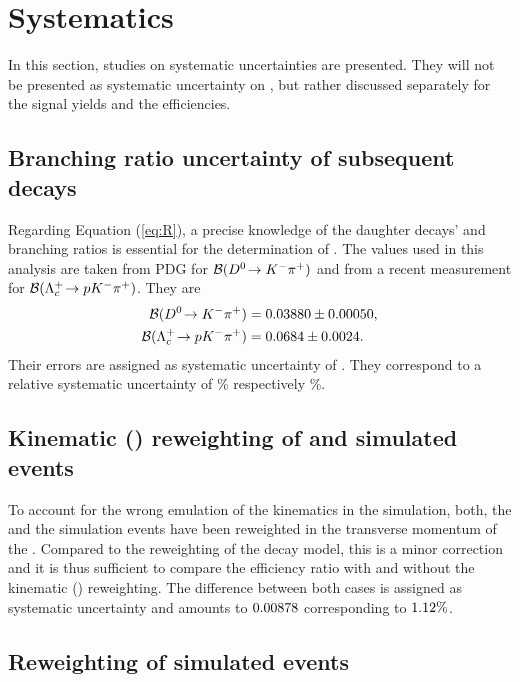 \chapter{Systematics}
\label{sec:Systematics}
In this section, studies on systematic uncertainties are presented.
They will not be presented as systematic uncertainty on \R, but rather discussed separately for the signal yields and the efficiencies.

\section{Branching ratio uncertainty of subsequent decays}
Regarding Equation (\ref{eq:R}), a precise knowledge of the daughter decays' \DToKpi and \LcTopKpi branching ratios is essential for the determination of \R.
The values used in this analysis are taken from PDG \cite{PDG} for ${\cal B}({{D}^0}\!\rightarrow {\ensuremath{{K}^-}}{\ensuremath{{\pi}^+}})$ and from a recent \belle measurement \cite{Belle_BR_LcTopKpi} for ${\cal B}({{\Lambda}^+_{c}}\!\rightarrow {\ensuremath{p}}{\ensuremath{{K}^-}}{\ensuremath{{\pi}^+}})$.
They are
\begin{align*}
    {\ensuremath{\cal B}}({{D}^0}\!\rightarrow {\ensuremath{{K}^-}}{\ensuremath{{\pi}^+}}) &= 0.03880 \pm 0.00050, \\ 
    {\cal B}({{\Lambda}^+_{c}}\!\rightarrow {\ensuremath{p}}{\ensuremath{{K}^-}}{\ensuremath{{\pi}^+}}) &= 0.0684 \pm 0.0024.
\end{align*}
Their errors are assigned as systematic uncertainty of \R.
They correspond to a relative systematic uncertainty of \SystBRDToKpipercent\% respectively \SystBRLcTopKpipercent\%.

\section{Kinematic \pt(\Lb) reweighting of \LbToDpmunuX and \LbToLcmunu simulated events}
To account for the wrong emulation of the \Lb kinematics in the simulation, both, the \LbToDpmunuX and the \LbToLcmunu simulation events have been reweighted in the transverse momentum of the \Lb.
Compared to the reweighting of the \LbToDpmunuX decay model, this is a minor correction and it is thus sufficient to compare the efficiency ratio \effRatio with and without the kinematic \pt(\Lb) reweighting.
The difference between both cases is assigned as systematic uncertainty and amounts to $0.00878$ corresponding to $1.12\%$.

\section{Reweighting of \LbToDpmunuX simulated events}
